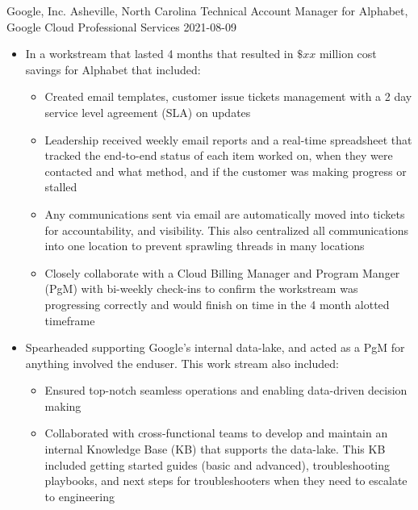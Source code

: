 \roleheader
{Google, Inc.}
{Asheville, North Carolina}
{Technical Account Manager for Alphabet, Google Cloud Professional Services}
{2021-08-09}
{}
\begin{itemize}

    \item In a workstream that lasted 4 months that resulted in $\$xx$ million cost savings for Alphabet that included:
          \begin{itemize}

              \item Created email templates, customer issue tickets management with a 2 day service level agreement (SLA) on updates

              \item Leadership received weekly email reports and a real-time spreadsheet that tracked the end-to-end status of each item worked on, when they were contacted and what method, and if the customer was making progress or stalled

              \item Any communications sent via email are automatically moved into tickets for accountability, and visibility. This also centralized all communications into one location to prevent sprawling threads in many locations

              \item Closely collaborate with a Cloud Billing Manager and Program Manger (PgM) with bi-weekly check-ins to confirm the workstream was progressing correctly and would finish on time in the 4 month alotted timeframe

          \end{itemize}

    \item Spearheaded supporting Google's internal data-lake, and acted as a PgM for anything involved the enduser. This work stream also included:

          \begin{itemize}

              \item Ensured top-notch seamless operations and enabling data-driven decision making

              \item Collaborated with cross-functional teams to develop and maintain an internal Knowledge Base (KB) that supports the data-lake. This KB included getting started guides (basic and advanced), troubleshooting playbooks, and next steps for troubleshooters when they need to escalate to engineering


\end{itemize}
\end{itemize}

